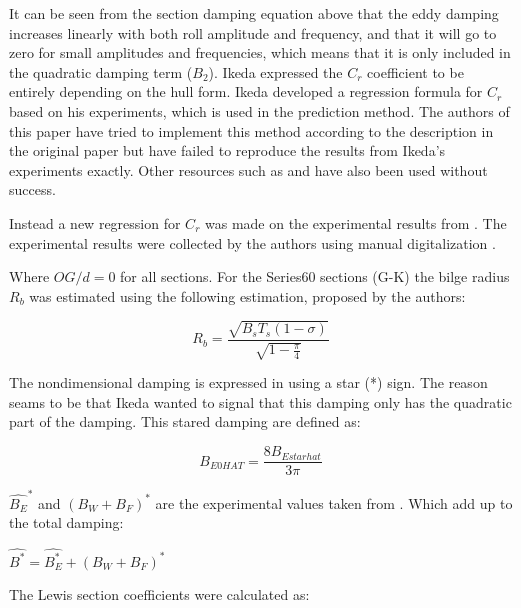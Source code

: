     

    It can be seen from the section damping equation above that the eddy
damping increases linearly with both roll amplitude and frequency, and
that it will go to zero for small amplitudes and frequencies, which
means that it is only included in the quadratic damping term (\(B_2\)).
Ikeda expressed the \(C_r\) coefficient to be entirely depending on the
hull form. Ikeda developed a regression formula for \(C_r\) based on his
experiments, which is used in the prediction method. The authors of this
paper have tried to implement this method according to the description
in the original paper \cite{7505983/4AFVVGNT} but have failed to
reproduce the results from Ikeda's experiments exactly. Other resources
such as \cite{7505983/FB64RGPF} and \cite{7505983/KAKIM2E2} have also
been used without success.

Instead a new regression for \(C_r\) was made on the experimental
results from \cite{7505983/4AFVVGNT}. The experimental results were
collected by the authors using manual digitalization
\cite{7505983/RXYIE6UW}.

    Where \(OG/d=0\) for all sections. For the Series60 sections (G-K) the
bilge radius \(R_b\) was estimated using the following estimation,
proposed by the authors:
 
            
    
    \begin{equation}
R_{b} = \frac{\sqrt{B_{s} T_{s} \left(1 - \sigma\right)}}{\sqrt{1 - \frac{\pi}{4}}}
\label{eq:equation}
\end{equation}

    

    The nondimensional damping is expressed in \cite{7505983/4AFVVGNT} using
a star (*) sign. The reason seams to be that Ikeda wanted to signal that
this damping only has the quadratic part of the damping. This stared
damping are defined as:
 
            
    
    \begin{equation}
B_{E0 HAT} = \frac{8 B_{E star hat}}{3 \pi}
\label{eq:equation}
\end{equation}

    

    \(\hat{B_E}^*\) and \((B_W+B_F)^*\) are the experimental values taken
from \cite{7505983/4AFVVGNT}. Which add up to the total damping:

    \(\hat{B^*} = \hat{B^*_E} + (B_W+B_F)^*\)

    The Lewis section coefficients were calculated as:
 
